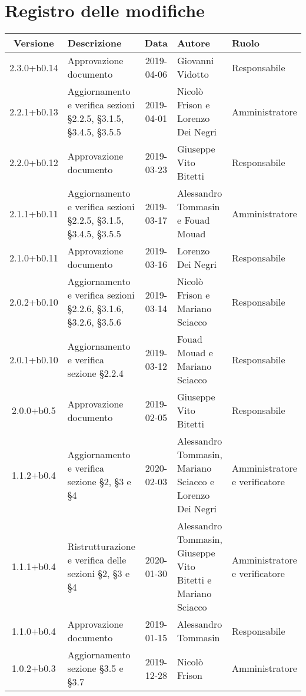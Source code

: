 \section*{Registro delle modifiche}

\begin{center}
	\begin{longtable}{|c|p{3.5cm}|c|p{3cm}|p{3cm}|}
	\hline
	\rowcolor{lighter-grayer}
	\textbf{Versione} & \textbf{Descrizione} & \textbf{Data} & \textbf{Autore} & \textbf{Ruolo} \\
	\hline
	\endfirsthead

	2.3.0+b0.14 & Approvazione documento & 2019-04-06 & Giovanni Vidotto & Responsabile \\
	\hline
	2.2.1+b0.13 & Aggiornamento e verifica sezioni \S2.2.5, \S3.1.5, \S3.4.5, \S3.5.5 & 2019-04-01 & Nicolò Frison e Lorenzo Dei Negri & Amministratore \\
	\hline
	2.2.0+b0.12 & Approvazione documento & 2019-03-23 & Giuseppe Vito Bitetti & Responsabile \\
	\hline
	2.1.1+b0.11 & Aggiornamento e verifica sezioni \S2.2.5, \S3.1.5, \S3.4.5, \S3.5.5 & 2019-03-17 & Alessandro Tommasin e Fouad Mouad & Amministratore \\
	\hline
	2.1.0+b0.11 & Approvazione documento & 2019-03-16 & Lorenzo Dei Negri & Responsabile \\
	\hline
	2.0.2+b0.10 & Aggiornamento e verifica sezioni \S2.2.6, \S3.1.6, \S3.2.6, \S3.5.6 & 2019-03-14 & Nicolò Frison e Mariano Sciacco & Responsabile \\
	\hline
	2.0.1+b0.10 & Aggiornamento e verifica sezione \S2.2.4 & 2019-03-12 & Fouad Mouad e Mariano Sciacco & Responsabile \\
	\hline
	2.0.0+b0.5 & Approvazione documento & 2019-02-05 & Giuseppe Vito Bitetti & Responsabile \\
	\hline
	1.1.2+b0.4 & Aggiornamento e verifica sezione \S2, \S3 e \S4 & 2020-02-03 & Alessandro Tommasin, Mariano Sciacco e Lorenzo Dei Negri & Amministratore e verificatore \\
	\hline
	1.1.1+b0.4 & Ristrutturazione e verifica delle sezioni \S2, \S3 e \S4 & 2020-01-30 & Alessandro Tommasin, Giuseppe Vito Bitetti e Mariano Sciacco & Amministratore e verificatore \\
	\hline
	1.1.0+b0.4 & Approvazione documento & 2019-01-15 & Alessandro Tommasin & Responsabile \\
	\hline
	1.0.2+b0.3 & Aggiornamento sezione \S3.5 e \S3.7 & 2019-12-28 & Nicolò Frison & Amministratore \\

\end{longtable}
\end{center}
